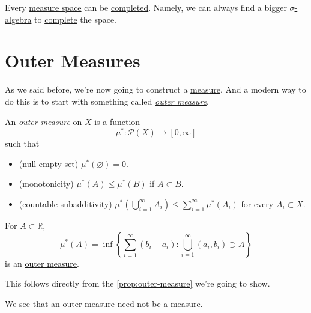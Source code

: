 \begin{exercise}
	Every \hyperref[def:measurable-space]{measure space} can be \hyperref[def:complete-measure-space]{completed}. Namely, we can always find a bigger \hyperref[def:sigma-algebra]{\(\sigma\)-algebra} to \hyperref[def:complete-measure-space]{complete} the space.
\end{exercise}

\section{Outer Measures}
As we said before, we're now going to construct a \hyperref[def:measure]{measure}. And a modern way to do this is to start with something called \emph{\hyperref[def:outer-measure]{outer measure}}.


\begin{definition}\label{def:outer-measure}
	An \emph{outer measure} on \(X\) is a function
	\[
		\mu^{\ast} \colon \mathcal{P} (X)\to [0, \infty ]
	\]
	such that
	\begin{itemize}
		\item\label{def:outer-measure-null-empty-set}(null empty set) \(\mu^{\ast} (\varnothing ) = 0\).
		\item\label{def:outer-measure-montonicity}(monotonicity) \(\mu^{\ast} (A)\leq \mu^{\ast} (B)\) if \(A\subset B\).
		\item\label{def:outer-measure-countable-subadditivity}(countable subadditivity) \(\mu^{\ast} \left(\bigcup_{i=1}^{\infty} A_{i}\right) \leq \sum_{i=1}^{\infty} \mu^{\ast} (A_{i})\) for every \(A_{i} \subset X \).
	\end{itemize}
\end{definition}

\begin{eg}
	For \(A\subset\mathbb{R} \),
	\[
		\mu^{\ast} (A) = \inf \left\{\sum_{i=1}^{\infty} (b_{i} - a_{i}) \colon \bigcup_{i=1}^{\infty} (a_{i}, b_{i})\supset A\right\}
	\]
	is an \hyperref[def:outer-measure]{outer measure}.
\end{eg}
\begin{explanation}
	This follows directly from the \autoref{prop:outer-measure} we're going to show.
\end{explanation}

\begin{remark}
	We see that an \hyperref[def:outer-measure]{outer measure} need not be a \hyperref[def:measure]{measure}.
\end{remark}

